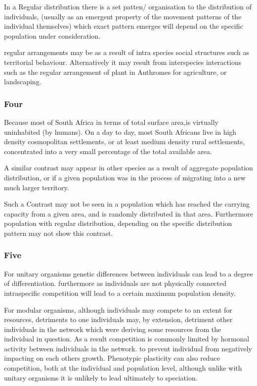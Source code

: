 \documentclass[]{article}
\begin{document}
In a Regular distribution there is a set patten/ organisation to the
distribution of individuals, (usually as an emergent property of the
movement patterns of the individual themselves) which exact pattern
emerges will depend on the specific population under consideration.

regular arrangements may be as a result of intra species social
structures such as territorial behaviour. Alternatively it may result
from interspecies interactions such as the regular arrangement of plant
in Anthromes for agriculture, or landscaping.

\hypertarget{four}{%
\subsubsection{Four}\label{four}}

Because most of South Africa in terms of total surface area,is virtually
uninhabited (by humans). On a day to day, most South Africans live in
high density cosmopolitan settlements, or at least medium density rural
settlements, concentrated into a very small percentage of the total
available area.

A similar contrast may appear in other species as a result of aggregate
population distribution, or if a given population was in the process of
migrating into a new much larger territory.

Such a Contrast may not be seen in a population which has reached the
carrying capacity from a given area, and is randomly distributed in that
area. Furthermore population with regular distribution, depending on the
specific distribution pattern may not show this contrast.

\hypertarget{five}{%
\subsubsection{Five}\label{five}}

For unitary organisms genetic differences between individuals can lead
to a degree of differentiation. furthermore as individuals are not
physically connected intraspecific competition will lead to a certain
maximum population density.

For modular organisms, although individuals may compete to an extent for
resources, detriments to one individuals may, by extension, detriment
other individuals in the network which were deriving some resources from
the individual in question. As a result competition is commonly limited
by hormonal activity between individuals in the network. to prevent
individual from negatively impacting on each others growth. Phenotypic
plasticity can also reduce competition, both at the individual and
population level, although unlike with unitary organisms it is unlikely
to lead ultimately to speciation.
\end{document}
